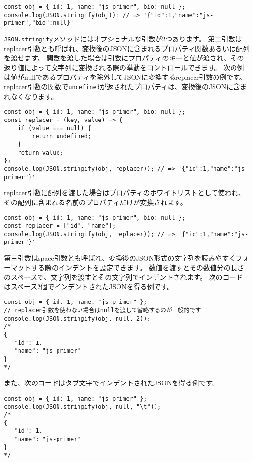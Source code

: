 \begin{lstlisting}
const obj = { id: 1, name: "js-primer", bio: null };
console.log(JSON.stringify(obj)); // => '{"id":1,"name":"js-primer","bio":null}'
\end{lstlisting}

\texttt{JSON.stringify}メソッドにはオプショナルな引数が2つあります。
第二引数はreplacer引数とも呼ばれ、変換後のJSONに含まれるプロパティ関数あるいは配列を渡せます。
関数を渡した場合は引数にプロパティのキーと値が渡され、その返り値によって文字列に変換される際の挙動をコントロールできます。
次の例は値がnullであるプロパティを除外してJSONに変換するreplacer引数の例です。
replacer引数の関数で\texttt{undefined}が返されたプロパティは、変換後のJSONに含まれなくなります。

\begin{lstlisting}
const obj = { id: 1, name: "js-primer", bio: null };
const replacer = (key, value) => {
    if (value === null) {
        return undefined;
    }
    return value;
};
console.log(JSON.stringify(obj, replacer)); // => '{"id":1,"name":"js-primer"}'
\end{lstlisting}

replacer引数に配列を渡した場合はプロパティのホワイトリストとして使われ、
その配列に含まれる名前のプロパティだけが変換されます。

\begin{lstlisting}
const obj = { id: 1, name: "js-primer", bio: null };
const replacer = ["id", "name"];
console.log(JSON.stringify(obj, replacer)); // => '{"id":1,"name":"js-primer"}'
\end{lstlisting}

第三引数はspace引数とも呼ばれ、変換後のJSON形式の文字列を読みやすくフォーマットする際のインデントを設定できます。
数値を渡すとその数値分の長さのスペースで、文字列を渡すとその文字列でインデントされます。
次のコードはスペース2個でインデントされたJSONを得る例です。

\begin{lstlisting}
const obj = { id: 1, name: "js-primer" };
// replacer引数を使わない場合はnullを渡して省略するのが一般的です
console.log(JSON.stringify(obj, null, 2)); 
/*
{
   "id": 1,
   "name": "js-primer"
}
*/
\end{lstlisting}

また、次のコードはタブ文字でインデントされたJSONを得る例です。

\begin{lstlisting}
const obj = { id: 1, name: "js-primer" };
console.log(JSON.stringify(obj, null, "\t")); 
/*
{
   "id": 1,
   "name": "js-primer"
}
*/
\end{lstlisting}

